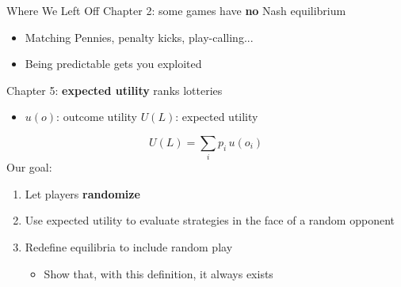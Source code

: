 \newcommand{\lot}[2]{\rule[-0.22in]{0pt}{0.55in}$\begin{pmatrix} \text{Score} & \text{Fail} \\ #1 & #2\end{pmatrix}$}



\frame{\maketitle}

\begin{frame}{Where We Left Off}
Chapter 2: some games have \textbf{no} Nash equilibrium
\begin{itemize}
    \item Matching Pennies, penalty kicks, play-calling...
    \item Being predictable gets you exploited
\end{itemize}
\bsk
Chapter 5: \textbf{expected utility} ranks lotteries
\begin{itemize}
    \item $u(o)$: outcome utility \qquad $U(L)$: expected utility
\end{itemize}
$$
    U(L) = \sum_i p_i\,u(o_i)
$$
\vfill
Our goal:
\begin{enumerate}
    \item Let players \textbf{randomize}
    \item Use expected utility to evaluate strategies in the face of a random opponent
    \item Redefine equilibria to include random play
    \begin{itemize}
        \item Show that, with this definition, it always exists
    \end{itemize}
\end{enumerate}
\vspace{-0.4in}
\end{frame}


